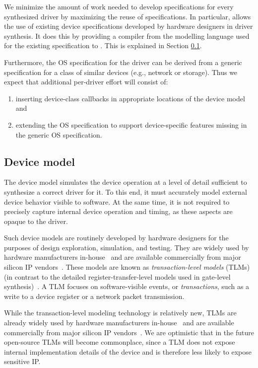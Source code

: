 We minimize the amount of work needed to develop specifications for every synthesized driver by maximizing the reuse of specifications.  In particular, \termite allows the use of existing device specifications developed by hardware designers in driver synthesis.  It does this by providing a compiler from the modelling language used for the existing specification to \tsl. This is explained in Section \ref{sec:device_model}.

Furthermore, the OS specification for the driver can be derived from a generic specification for a class of similar devices (e.g., network or storage).  Thus we expect that additional per-driver effort will consist of: 
\begin{enumerate}
    \item inserting device-class callbacks in appropriate locations of the device model and 
    \item extending the OS specification to support device-specific features missing in the  generic OS specification.
\end{enumerate}

\subsection{Device model}
\label{sec:device_model}

The device model simulates the device operation at a level of detail sufficient to synthesize a correct driver for it.  To this end, it must accurately model external device behavior visible to software.  At the same time, it is not required to precisely capture internal device operation and timing, as these aspects are opaque to the driver.

Such device models are routinely developed by hardware designers for the purposes of design exploration, simulation, and testing. They are widely used by hardware manufacturers in-house~\cite{cofluent} and are available commercially from major silicon IP vendors~\cite{vp}.  These models are known as \emph{transaction-level models} (TLMs) (in contrast to the detailed register-transfer-level models used in gate-level synthesis)~\cite{Cai_Gajski_03}.  A TLM focuses on software-visible events, or \emph{transactions}, such as a write to a device register or a network packet transmission.

While the transaction-level modeling technology is relatively new, TLMs are already widely used by hardware manufacturers in-house~\cite{cofluent} and are available commercially from major silicon IP vendors~\cite{vp}.  We are optimistic that in the future open-source TLMs will become commonplace, since a TLM does not expose internal implementation details of the device and is therefore less likely to expose sensitive IP.

